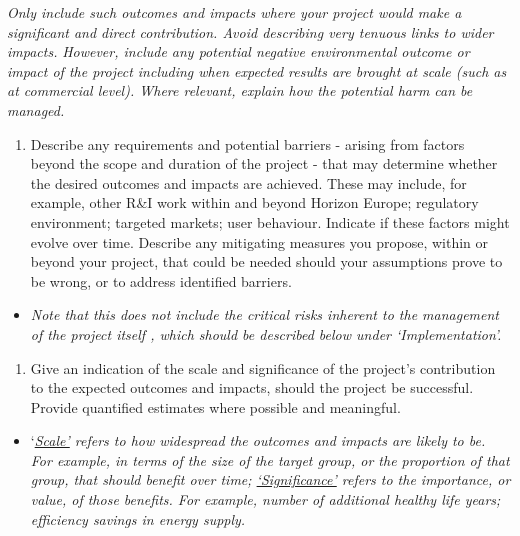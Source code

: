 \emph{Only include such outcomes and impacts where your project would
make a significant and direct contribution. Avoid describing very
tenuous links to wider impacts.} \emph{However, include any potential
negative environmental outcome or impact of the project including when
expected results are brought at scale (such as at commercial level).
Where relevant, explain how the potential harm can be managed.}

\begin{enumerate}
\def\labelenumi{\alph{enumi}.}
\item
  Describe any requirements and potential barriers - arising from
  factors beyond the scope and duration of the project - that may
  determine whether the desired outcomes and impacts are achieved. These
  may include, for example, other R\&I work within and beyond Horizon
  Europe; regulatory environment; targeted markets; user behaviour.
  Indicate if these factors might evolve over time. Describe any
  mitigating measures you propose, within or beyond your project, that
  could be needed should your assumptions prove to be wrong, or to
  address identified barriers.
\end{enumerate}

\begin{itemize}
\item
  \emph{Note that this does not include the critical risks inherent to
  the management of the project itself , which should be described below
  under `Implementation'.}
\end{itemize}

\begin{enumerate}
\def\labelenumi{\alph{enumi}.}
\item
  Give an indication of the scale and significance of the project's
  contribution to the expected outcomes and impacts, should the project
  be successful. Provide quantified estimates where possible and
  meaningful.
\end{enumerate}

\begin{itemize}
\item
  `\emph{\uline{Scale}\uline{'} refers to how widespread the outcomes
  and impacts are likely to be. For example, in terms of the size of the
  target group, or the proportion of that group, that should benefit
  over time; \uline{`}\uline{Significance}\uline{'} refers to the
  importance, or value, of those benefits. For example, number of
  additional healthy life years; efficiency savings in energy supply.}
\end{itemize}

